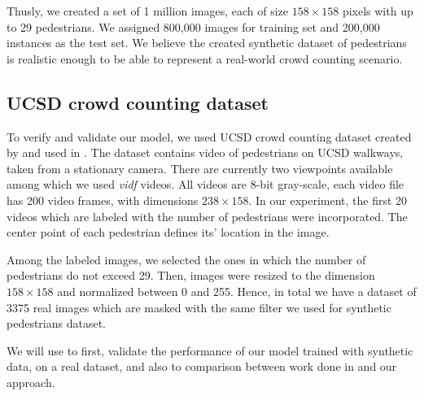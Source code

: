 \noindent Thusly, we created a set of 1 million images, each of size $158\times158$ pixels with up to 29 pedestrians. We assigned 800,000 images for training set and 200,000 instances as the test set. We believe the created synthetic dataset of pedestrians is realistic enough to be able to represent a real-world crowd counting scenario.

\subsection{UCSD crowd counting dataset}
\label{subsec:datareal2}
To verify and validate our model, we used UCSD crowd counting dataset created by \citeauthor*{chan2008privacy} and used in \cite{chan2008privacy,chan2009bayesian,chan2012counting}. The dataset contains video of pedestrians on UCSD walkways, taken from a stationary camera. There are currently two  viewpoints available among which we used \textit{vidf} videos. All videos are 8-bit gray-scale, each video file has 200 video frames, with dimensions $238\times158$. In our experiment, the first 20 videos which are labeled with the number of pedestrians were incorporated. The center point of each pedestrian defines its' location in the image. 

\indent Among the labeled images, we selected the ones in which the number of pedestrians do not exceed 29. Then, images were resized to the dimension $158\times158$ and normalized between 0 and 255. Hence, in total we have a dataset of 3375 real images which are masked with the same filter we used for synthetic pedestrians dataset. 

\indent We will use to first, validate the performance of our model trained with synthetic data, on a real dataset, and also to comparison between work done in \cite{chan2008privacy} and our approach. 